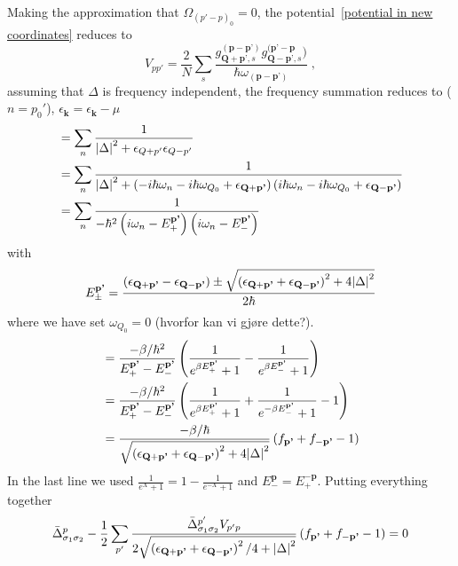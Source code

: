 \documentclass{article}
\begin{document}
Making the approximation that $\Omega_{\left(p' - p\right)_0} = 0$, the potential~\cref{potential in new coordinates} reduces to
\begin{equation}
    V_{pp'} = \frac{2}{N} \sum_s \frac{g_{\textbf{Q} + \textbf{p'},s}^{(\textbf{p} - \textbf{p'})} g_{\textbf{Q} - \textbf{p'},s}^{(\textbf{p'} - \textbf{p}})}{\hbar \omega_{(\textbf{p} - \textbf{p'})}}\;,
    \label{potential in new coordinates}
\end{equation}
assuming that $\Delta$ is frequency independent, the frequency summation reduces to ($n = p_0'$), $\epsilon_{\textbf{k}} = \epsilon_{\textbf{k}} - \mu$
\begin{align}
         &=  \sum_{n} \frac{1}{\abs{\Delta}^2 + \epsilon_{Q+p'} \epsilon_{Q-p'}} \nonumber \\
         &=  \sum_{n} \frac{1}{\abs{\Delta}^2 + \left(-i\hbar\omega_n - i \hbar \omega_{Q_0} + \epsilon_{\textbf{Q} + \textbf{p'}}\right) \left(i\hbar\omega_n - i \hbar \omega_{Q_0} + \epsilon_{\textbf{Q} - \textbf{p'}}\right)} \nonumber \\
         &= \sum_{n} \frac{1}{-\hbar^2\left(i\omega_n - E_+^{\textbf{p'}}\right)\left(i\omega_n - E_-^{\textbf{p'}}\right)} \nonumber\\
\end{align}
with 
\begin{equation}
        E_{\pm}^{\textbf{p'}} = \frac{\left(\epsilon_{\textbf{Q} + \textbf{p'}} - \epsilon_{\textbf{Q} - \textbf{p'}}\right) \pm \sqrt{\left(\epsilon_{\textbf{Q} + \textbf{p'}} + \epsilon_{\textbf{Q} - \textbf{p'}}\right)^2 + 4 \abs{\Delta}^2 } }{2\hbar}
\end{equation} 
where we have set $\omega_{Q_0} = 0$ (hvorfor kan vi gjøre dette?).
\begin{align}
         &=  \frac{-\beta / \hbar^2}{E_+^{\textbf{p'}} - E_-^{\textbf{p'}}}\left(\frac{1}{e^{\beta E_+^{\textbf{p'}}} + 1} - \frac{1}{e^{\beta E_-^{\textbf{p'}}} + 1}\right)\nonumber\\
         &=  \frac{-\beta / \hbar^2}{E_+^{\textbf{p'}} - E_-^{\textbf{p'}}}\left(\frac{1}{e^{\beta E_+^{\textbf{p'}}} + 1} + \frac{1}{e^{-\beta E_-^{\textbf{p'}}} + 1} - 1\right)\nonumber\\
         &=  \frac{-\beta / \hbar}{\sqrt{\left(\epsilon_{\textbf{Q} + \textbf{p'}} + \epsilon_{\textbf{Q} - \textbf{p'}}\right)^2 + 4 \abs{\Delta}^2 }}\left(f_{\textbf{p'}} + f_{-\textbf{p'}} - 1\right)\nonumber\\
\end{align}
In the last line we used $\frac{1}{e^X + 1} = 1 - \frac{1}{e^{-X} + 1}$ and $E_-^{\textbf{p}} = E_+^{-\textbf{p}}$. Putting everything together
\begin{equation}
\bar{\Delta}^{p}_{\sigma_1 \sigma_2} - \frac{1}{2} \sum_{p'} \frac{\bar{\Delta}_{\sigma_1 \sigma_2}^{p'} V_{p'p}}{2\sqrt{\left(\epsilon_{\textbf{Q} + \textbf{p'}} + \epsilon_{\textbf{Q} - \textbf{p'}}\right)^2 / 4 + \abs{\Delta}^2 }}\left(f_{\textbf{p'}} + f_{-\textbf{p'}} - 1\right)= 0
\label{final gap equation}
\end{equation}
\end{document}
